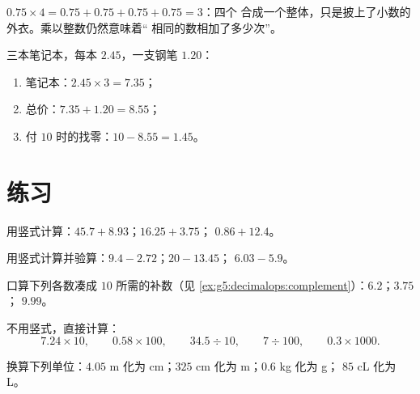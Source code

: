 \begin{example}[重复加法依然适用]\label{ex:g5:decimalops:mult}
$0.75 \times 4 = 0.75 + 0.75 + 0.75 + 0.75 = 3$：四个
合成一个整体，只是披上了小数的外衣。乘以整数仍然意味着“
相同的数相加了多少次”。
\end{example}

\begin{example}[购物]\label{ex:g5:decimalops:shopping}
三本笔记本，每本 $2.45$，一支钢笔 $1.20$：
\begin{enumerate}
  \item 笔记本：$2.45 \times 3 = 7.35$；
  \item 总价：$7.35 + 1.20 = 8.55$；
  \item 付 $10$ 时的找零：$10 - 8.55 = 1.45$。
\end{enumerate}
\end{example}

\section{练习}

\begin{exercise}[$\star$]\label{exo:g5:decimalops:1}
用竖式计算：$45.7 + 8.93$；\quad $16.25 + 3.75$；\quad
$0.86 + 12.4$。
\end{exercise}

\begin{exercise}[$\star$]\label{exo:g5:decimalops:2}
用竖式计算并验算：$9.4 - 2.72$；\quad $20 - 13.45$；
\quad $6.03 - 5.9$。
\end{exercise}

\begin{exercise}[$\star$]\label{exo:g5:decimalops:3}
口算下列各数凑成 $10$ 所需的补数（见
\cref{ex:g5:decimalops:complement}）：$6.2$；\quad $3.75$；\quad
$9.99$。
\end{exercise}

\begin{exercise}[$\star$]\label{exo:g5:decimalops:4}
不用竖式，直接计算：
\[
7.24 \times 10, \qquad
0.58 \times 100, \qquad
34.5 \div 10, \qquad
7 \div 100, \qquad
0.3 \times 1000 .
\]
\end{exercise}

\begin{exercise}[$\star$]\label{exo:g5:decimalops:5}
换算下列单位：$4.05$ m 化为 cm；\quad $325$ cm 化为 m；\quad $0.6$ kg 化为 g；
\quad $85$ cL 化为 L。
\end{exercise}

